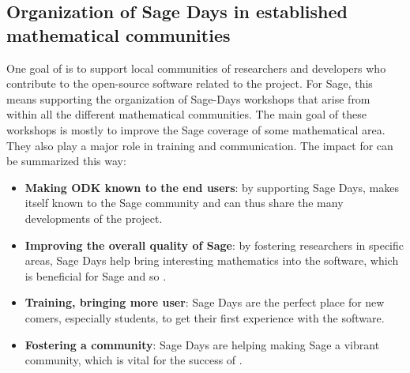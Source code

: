 \documentclass{deliverablereport}
\begin{document}


















\subsection{Organization of Sage Days in established mathematical communities}

One goal of \ODK is to support local communities of researchers
and developers who contribute to the open-source software related to
the project. For Sage, this means supporting the organization of Sage-Days
workshops that arise from within all the different mathematical communities. The main 
goal of these workshops is mostly to improve the Sage coverage of some mathematical
area. They also play a major role in training and communication. The
impact for \ODK can be summarized this way:

\begin{itemize}
\item \textbf{Making ODK known to the end users}: by supporting Sage Days,
\ODK makes itself known to the Sage community and can
thus share the many developments of the project.

\item \textbf{Improving the overall quality of Sage}: by fostering researchers
in specific areas, Sage Days help bring interesting mathematics into
the software, which is beneficial for Sage and so \ODK.

\item \textbf{Training, bringing more user}: Sage Days are the perfect place
for new comers, especially students, to get their first experience with the software.

\item \textbf{Fostering a community}: Sage Days are helping making Sage a vibrant
community, which is vital for the success of \ODK.
\end{itemize}
\end{document}
